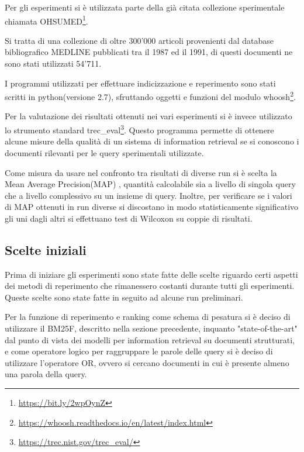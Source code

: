 \documentclass[runningheads]{llncs}
\begin{document}
Per gli esperimenti si \`e utilizzata parte della gi\`a citata collezione sperimentale chiamata OHSUMED\footnote{ \url{https://bit.ly/2wpOynZ}}.

Si tratta di una collezione di oltre 300'000 articoli provenienti dal database bibliografico MEDLINE pubblicati tra il 1987 ed il 1991, di questi documenti ne sono stati utilizzati 54'711.

I programmi utilizzati per effettuare indicizzazione e reperimento sono stati scritti in python(versione 2.7), sfruttando oggetti e funzioni del modulo whoosh\footnote{ \url{https://whoosh.readthedocs.io/en/latest/index.html}}.

Per la valutazione dei risultati ottenuti nei vari esperimenti si \`e invece utilizzato lo strumento standard trec\_eval\footnote{ \url{https://trec.nist.gov/trec\_eval/}}.
Questo programma permette di ottenere alcune misure della qualit\`a di un sistema di information retrieval se si conoscono i documenti rilevanti per le query sperimentali utilizzate.

Come misura da usare nel confronto tra risultati di diverse run si \`e scelta la Mean Average Precision(MAP)\cite{WBC_map} , quantit\`a calcolabile sia a livello di singola query che a livello complessivo su un insieme di query.
Inoltre, per verificare se i valori di MAP ottenuti in run diverse si discostano in modo statisticamente significativo gli uni dagli altri si effettuano test di Wilcoxon\cite{} su coppie di risultati. \par

\subsection{Scelte iniziali}

Prima di iniziare gli esperimenti sono state fatte delle scelte riguardo certi aspetti dei metodi di reperimento che rimanessero costanti durante tutti gli esperimenti.
Queste scelte sono state fatte in seguito ad alcune run preliminari.

Per la funzione di reperimento e ranking come schema di pesatura si \`e deciso di utilizzare il BM25F, descritto nella sezione precedente, inquanto "state-of-the-art" dal punto di vista dei modelli per information retrieval su documenti strutturati, e come operatore logico per raggruppare le parole delle query si \`e deciso di utilizzare l'operatore OR, ovvero si cercano documenti in cui \`e presente almeno una parola della query.
\end{document}

